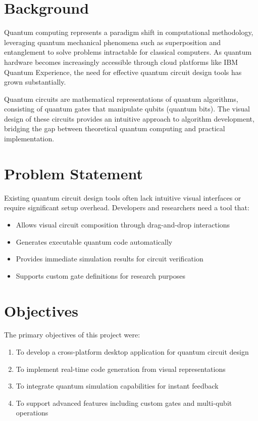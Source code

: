 \documentclass[12pt, a4paper, oneside]{report}
\theoremstyle{plain}
\theoremstyle{definition}
\theoremstyle{remark}
\begin{document}
\section{Background}
Quantum computing represents a paradigm shift in computational methodology, leveraging quantum mechanical phenomena such as superposition and entanglement to solve problems intractable for classical computers. As quantum hardware becomes increasingly accessible through cloud platforms like IBM Quantum Experience, the need for effective quantum circuit design tools has grown substantially.

Quantum circuits are mathematical representations of quantum algorithms, consisting of quantum gates that manipulate qubits (quantum bits). The visual design of these circuits provides an intuitive approach to algorithm development, bridging the gap between theoretical quantum computing and practical implementation.

\section{Problem Statement}
Existing quantum circuit design tools often lack intuitive visual interfaces or require significant setup overhead. Developers and researchers need a tool that:
\begin{itemize}
	\item Allows visual circuit composition through drag-and-drop interactions
	\item Generates executable quantum code automatically
	\item Provides immediate simulation results for circuit verification
	\item Supports custom gate definitions for research purposes
\end{itemize}

\section{Objectives}
The primary objectives of this project were:
\begin{enumerate}
	\item To develop a cross-platform desktop application for quantum circuit design
	\item To implement real-time code generation from visual representations
	\item To integrate quantum simulation capabilities for instant feedback
	\item To support advanced features including custom gates and multi-qubit operations
\end{enumerate}
\end{document}
